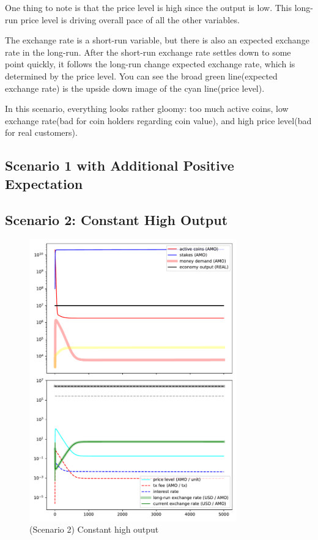 \documentclass[a4paper,11pt]{scrartcl}
\begin{document}
One thing to note is that the price level is high since the output is low. This long-run price level is driving overall pace of all the other variables.

The exchange rate is a short-run variable, but there is also an expected
exchange rate in the long-run. After the short-run exchange rate settles down
to some point quickly, it follows the long-run change expected exchange rate,
which is determined by the price level. You can see the broad green
line(expected exchange rate) is the upside down image of the cyan line(price
level).

In this scenario, everything looks rather gloomy: too much active coins, low
exchange rate(bad for coin holders regarding coin value), and high price
level(bad for real customers).

\subsection{Scenario 1 with Additional Positive Expectation}
\label{sc1.1}

\subsection{Scenario 2: Constant High Output}
\label{sc2}

\begin{figure}[hbt!]
	\centering
	\includegraphics[width=0.8\textwidth]{fig/fig2.pdf}
	\caption{(Scenario 2) Constant high output}
	\label{fig:sc2}
\end{figure}
\end{document}
